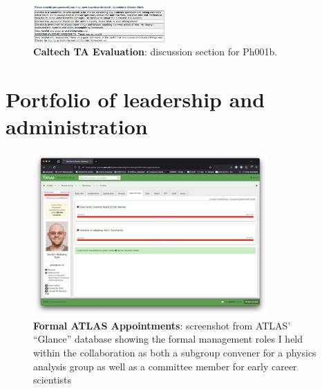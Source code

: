 \begin{figure}[h!]
	\hspace{1em}
\end{figure}

\begin{figure}[h!]
	\centering
	\caption{\textbf{Caltech TA Evaluation}: discussion section for Ph001b.}
	\includegraphics[width=0.45\textwidth]{attachments/E-teaching/2010_Ph1}
\end{figure}


\chapter{Portfolio of leadership and administration}

\begin{figure}[h!]
	\centering
	\caption{\textbf{Formal ATLAS Appointments}: screenshot from ATLAS' \enquote{Glance} database showing the formal management roles I held within the collaboration as both a subgroup convener for a physics analysis group as well as a committee member for early career scientists}
	\includegraphics[width=0.80\textwidth]{attachments/F-leadership/atlasAppointments}
\end{figure}

